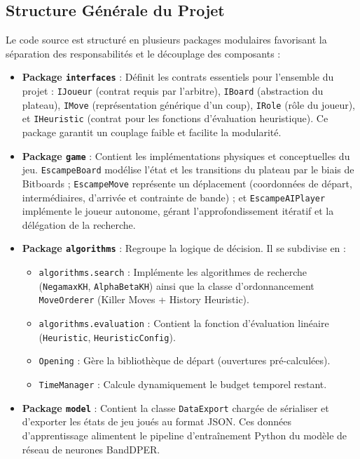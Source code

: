 \documentclass[12pt,a4paper]{article}
\begin{document}
\subsection{Structure Générale du Projet}
Le code source est structuré en plusieurs packages modulaires favorisant la séparation des responsabilités et le découplage des composants :
\begin{itemize}
    \item \textbf{Package \texttt{interfaces}} : Définit les contrats essentiels pour l'ensemble du projet : \texttt{IJoueur} (contrat requis par l'arbitre), \texttt{IBoard} (abstraction du plateau), \texttt{IMove} (représentation générique d'un coup), \texttt{IRole} (rôle du joueur), et \texttt{IHeuristic} (contrat pour les fonctions d'évaluation heuristique). Ce package garantit un couplage faible et facilite la modularité.
    \item \textbf{Package \texttt{game}} : Contient les implémentations physiques et conceptuelles du jeu. \texttt{EscampeBoard} modélise l'état et les transitions du plateau par le biais de Bitboards ; \texttt{EscampeMove} représente un déplacement (coordonnées de départ, intermédiaires, d'arrivée et contrainte de bande) ; et \texttt{EscampeAIPlayer} implémente le joueur autonome, gérant l'approfondissement itératif et la délégation de la recherche.
    \item \textbf{Package \texttt{algorithms}} : Regroupe la logique de décision. Il se subdivise en :
        \begin{itemize}
            \item \texttt{algorithms.search} : Implémente les algorithmes de recherche (\texttt{NegamaxKH}, \texttt{AlphaBetaKH}) ainsi que la classe d'ordonnancement \texttt{MoveOrderer} (Killer Moves + History Heuristic).
            \item \texttt{algorithms.evaluation} : Contient la fonction d'évaluation linéaire (\texttt{Heuristic}, \texttt{HeuristicConfig}).
            \item \texttt{Opening} : Gère la bibliothèque de départ (ouvertures pré-calculées).
            \item \texttt{TimeManager} : Calcule dynamiquement le budget temporel restant.
        \end{itemize}
    \item \textbf{Package \texttt{model}} : Contient la classe \texttt{DataExport} chargée de sérialiser et d'exporter les états de jeu joués au format JSON. Ces données d'apprentissage alimentent le pipeline d'entraînement Python du modèle de réseau de neurones BandDPER.

\end{itemize}
\end{document}
